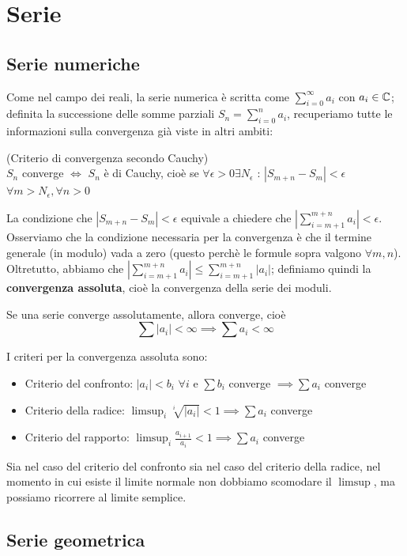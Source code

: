 \chapter{Serie}

\section{Serie numeriche}

Come nel campo dei reali, la serie numerica è scritta come $\sum_{i=0} ^{\infty} a_i$ con $a_i \in \mathbb{C}$; definita la successione delle somme parziali $S_n=\sum_{i=0} ^n a_i$, recuperiamo tutte le informazioni sulla convergenza già viste in altri ambiti:
\begin{teorema} (Criterio di convergenza secondo Cauchy)\\$S_n$ converge $\iff$ $S_n$ è di Cauchy, cioè se $\forall \epsilon >0 \exists N_{\epsilon}$ : $|S_{m+n} - S_m| < \epsilon$ $\forall m>N_{\epsilon}, \forall n>0$
\end{teorema}
La condizione che $|S_{m+n} - S_m| < \epsilon$ equivale a chiedere che $\left|\sum_{i=m+1} ^{m+n} a_i \right| < \epsilon$. \\Osserviamo che la condizione necessaria per la convergenza è che il termine generale (in modulo) vada a zero (questo perchè le formule sopra valgono $\forall m,n$). Oltretutto, abbiamo che $\left|\sum_{i=m+1} ^{m+n} a_i \right| \leq \sum_{i=m+1} ^{m+n} |a_i|$; definiamo quindi la \textbf{convergenza assoluta}, cioè la convergenza della serie dei moduli.
\begin{teorema}
Se una serie converge assolutamente, allora converge, cioè 
$$\sum |a_i|<\infty \implies \sum a_i<\infty$$
\end{teorema}
I criteri per la convergenza assoluta sono:
\begin{itemize}
\item Criterio del confronto:	$|a_i|<b_i$ $\forall i$ e $\sum b_i$ converge $\implies \sum a_i$ converge
\item Criterio della radice:		$\limsup_i \sqrt[i] {|a_i|} <1 \implies \sum a_i$ converge
\item Criterio del rapporto:		$\limsup_i \frac{a_{i+1}}{a_i}<1 \implies \sum a_i$ converge
\end{itemize}
Sia nel caso del criterio del confronto sia nel caso del criterio della radice, nel momento in cui esiste il limite normale non dobbiamo scomodare il $\limsup$, ma possiamo ricorrere al limite semplice.

\section{Serie geometrica}

